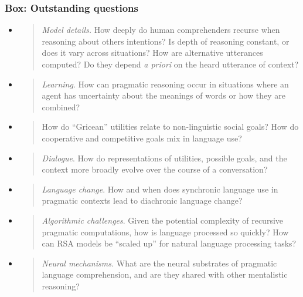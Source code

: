 \documentclass[]{elsarticle}
\begin{document}
\subsubsection{Box: Outstanding questions
}\label{box-outstanding-questions}

\begin{itemize}
\item
  \begin{quote}
  \emph{Model details.} How deeply do human comprehenders recurse when
  reasoning about others intentions? Is depth of reasoning constant, or
  does it vary across situations? How are alternative utterances
  computed? Do they depend \emph{a priori} on the heard utterance of
  context?
  \end{quote}
\item
  \begin{quote}
  \emph{Learning}. How can pragmatic reasoning occur in situations where
  an agent has uncertainty about the meanings of words or how they are
  combined?
  \end{quote}
\item
  \begin{quote}
  How do ``Gricean'' utilities relate to non-linguistic social goals?
  How do cooperative and competitive goals mix in language use?
  \end{quote}
\item
  \begin{quote}
  \emph{Dialogue}. How do representations of utilities, possible goals,
  and the context more broadly evolve over the course of a conversation?
  \end{quote}
\item
  \begin{quote}
  \emph{Language change}. How and when does synchronic language use in
  pragmatic contexts lead to diachronic language change?
  \end{quote}
\item
  \begin{quote}
  \emph{Algorithmic challenges}. Given the potential complexity of
  recursive pragmatic computations, how is language processed so
  quickly? How can RSA models be ``scaled up'' for natural language
  processing tasks?
  \end{quote}
\item
  \begin{quote}
  \emph{Neural mechanisms.} What are the neural substrates of pragmatic
  language comprehension, and are they shared with other mentalistic
  reasoning?
  \end{quote}
\end{itemize}
\end{document}
